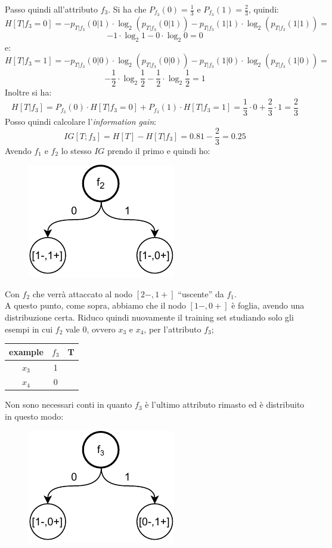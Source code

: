 \documentclass[a4paper,12pt, oneside]{book}
\begin{document}
\begin{esercizio}
  Passo quindi all'attributo $f_3$. Si ha che $P_{f_3}(0)=\frac{1}{3}$ e
  $P_{f_3}(1)=\frac{2}{3}$, quindi:
  \[H[T|f_3=0]=-p_{T|f_3}(0|1)\cdot \log_2(p_{T|f_3}(0|1))-p_{T|f_3}(1|1)\cdot
    \log_2(p_{T|f_3}(1|1))=\]
  \[-1\cdot \log_2 1-0\cdot \log_2 0=0\]
  e:
  \[H[T|f_3=1]=-p_{T|f_3}(0|0)\cdot \log_2(p_{T|f_3}(0|0))-p_{T|f_3}(1|0)\cdot
    \log_2(p_{T|f_3}(1|0))=\]
  \[-\frac{1}{2}\cdot \log_2 \frac{1}{2}-\frac{1}{2}\cdot \log_2 \frac{1}{2}=1\]
  Inoltre si ha:
  \[H[T|f_3]=P_{f_3}(0)\cdot H[T|f_3=0]+P_{f_3}(1)\cdot
    H[T|f_3=1]=\frac{1}{3}\cdot 0+\frac{2}{3}\cdot 1=\frac{2}{3}\]
  Posso quindi calcolare l'\textit{information gain}:
  \[IG[T;f_3]=H[T]-H[T|f_3]=0.81-\frac{2}{3}=0.25\]
  Avendo $f_1$ e $f_2$ lo stesso $IG$ prendo il primo e quindi ho:
  \begin{figure}[H]
    \centering
    \includegraphics[scale = 0.9]{img/id6.pdf}
  \end{figure}
  Con $f_2$ che verrà attaccato al nodo $[2-,1+]$ ``uscente'' da $f_1$.\\
  A questo punto, come sopra, abbiamo che il nodo $[1-,0+]$ è foglia, avendo una
  distribuzione certa. Riduco quindi nuovamente il training set studiando solo
  gli esempi in cui $f_2$ vale 0, ovvero $x_3$ e $x_4$, per l'attributo $f_3$;
  \begin{table}[H]
    \centering
    \begin{tabular}{c|c|c}
      example & $f_3$ & T\\
      \hline
      $x_3$ & 1 & \color{darkgreen}{1}\\
      $x_4$ & 0 & \color{red}{0}\\
    \end{tabular}
  \end{table}
  \newpage
  Non sono necessari conti in quanto $f_3$ è l'ultimo attributo rimasto ed è
  distribuito in questo modo:
  \begin{figure}[H]
    \centering
    \includegraphics[scale = 0.9]{img/id7.pdf}

\end{figure}
\end{esercizio}
\end{document}
